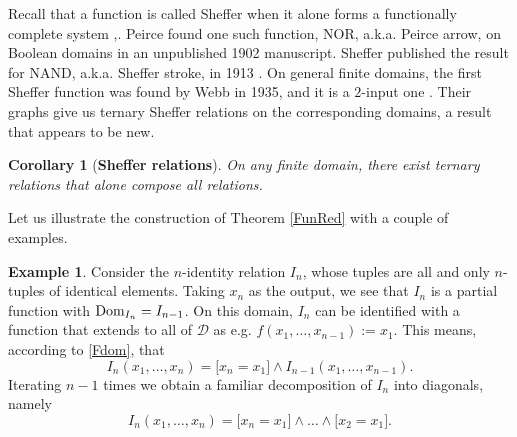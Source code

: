 \documentclass[11pt]{article}
\theoremstyle{plain}
\newtheorem{corollary}{Corollary}
\theoremstyle{definition}
\newtheorem{example}{Example}
\def\D{\mathcal{D}}
\begin{document}
Recall that a function is called  Sheffer when it alone forms a functionally complete system \cite[11.2]{Lau},\cite{Ros76}. Peirce found one such function, NOR, a.k.a. Peirce arrow, on Boolean domains in an unpublished 1902 manuscript. Sheffer published the result for NAND, a.k.a. Sheffer stroke, in 1913 \cite{AnelTT}. On general finite domains, the first Sheffer function was found by Webb in 1935, and it is a $2$-input one \cite{Ros76,Zus16}. Their graphs give us ternary Sheffer relations on the corresponding domains, a result that appears to be new.
\begin{corollary}[{\bf Sheffer relations}]\label{ShefRel} On any finite domain, there exist ternary relations that alone compose all relations.
\end{corollary}
Let us illustrate the construction of Theorem \ref{FunRed} with a couple of examples.
\begin{example} Consider the $n$-identity relation $I_n$, whose tuples are all and only $n$-tuples of identical elements. Taking $x_n$ as the output, we see that $I_n$ is a partial function with $\textup{Dom}_{I_n}=I_{n-1}$. On this domain, $I_n$ can be identified with a function that extends to all of $\D$ as e.g. $f(x_1,\dots,x_{n-1}):=x_1$. This means, according to \eqref{Fdom}, that
\begin{equation*}
I_n(x_1,\dots,x_n)=\big[x_n=x_1\big]\land I_{n-1}(x_1,\dots,x_{n-1}).
\end{equation*}
Iterating $n-1$ times we obtain a familiar decomposition of $I_n$ into diagonals, namely
\begin{equation*}
I_n(x_1,\dots,x_n)=\big[x_n=x_1\big]\land\dots\land\big[x_2=x_1\big].
\end{equation*}
\end{example}
\end{document}
